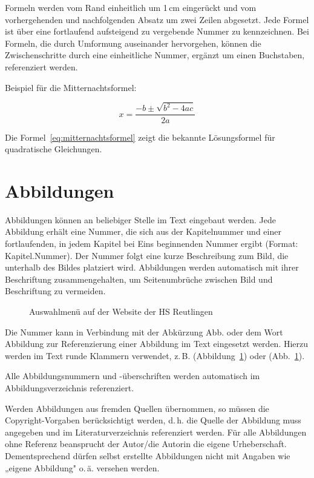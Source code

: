 Formeln werden vom Rand einheitlich um 1\,cm eingerückt und vom vorhergehenden und nachfolgenden Absatz um zwei Zeilen abgesetzt. Jede Formel ist über eine fortlaufend aufsteigend zu vergebende Nummer zu kennzeichnen. Bei Formeln, die durch Umformung auseinander hervorgehen, können die Zwischenschritte durch eine einheitliche Nummer, ergänzt um einen Buchstaben, referenziert werden.

Beispiel für die Mitternachtsformel:

\begin{equation}
	x = \frac{-b \pm \sqrt{b^2 - 4ac}}{2a}
	\label{eq:mitternachtsformel}
\end{equation}

Die Formel~\ref{eq:mitternachtsformel} zeigt die bekannte Lösungsformel für quadratische Gleichungen.

\section{Abbildungen}
\label{sec:abbildungen}

Abbildungen können an beliebiger Stelle im Text eingebaut werden. Jede Abbildung erhält eine Nummer, die sich aus der Kapitelnummer und einer fortlaufenden, in jedem Kapitel bei Eins beginnenden Nummer ergibt (Format: Kapitel.Nummer). Der Nummer folgt eine kurze Beschreibung zum Bild, die unterhalb des Bildes platziert wird. Abbildungen werden automatisch mit ihrer Beschriftung zusammengehalten, um Seitenumbrüche zwischen Bild und Beschriftung zu vermeiden.

\begin{figure}[h]
	\centering
	\caption{Auswahlmenü auf der Website der HS Reutlingen}
	\label{fig:hs_website}
\end{figure}

Die Nummer kann in Verbindung mit der Abkürzung Abb. oder dem Wort Abbildung zur Referenzierung einer Abbildung im Text eingesetzt werden. Hierzu werden im Text runde Klammern verwendet, z.\,B. (Abbildung~\ref{fig:hs_website}) oder (Abb.~\ref{fig:hs_website}).

Alle Abbildungsnummern und -überschriften werden automatisch im Abbildungsverzeichnis referenziert.

Werden Abbildungen aus fremden Quellen übernommen, so müssen die Copyright-Vorgaben berücksichtigt werden, d.\,h. die Quelle der Abbildung muss angegeben und im Literaturverzeichnis referenziert werden. Für alle Abbildungen ohne Referenz beansprucht der Autor/die Autorin die eigene Urheberschaft. Dementsprechend dürfen selbst erstellte Abbildungen nicht mit Angaben wie „eigene Abbildung" o.\,ä. versehen werden.

